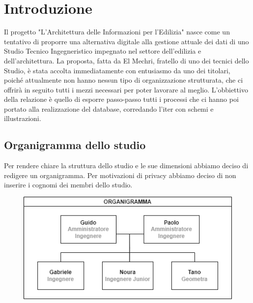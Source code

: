 \documentclass{elegantbook}
\begin{document}
        \newcommand\percImpresa{\the\numexpr\volumeImpresa/100\relax}
        \newcommand\volumeRappresentanza{\the\numexpr\percImpresa * 97 + \percImpresa * 3 *3 \relax}


        \newcommand\volumeNormalizzazione{\the\numexpr(\volumeCertificato/100)*40 + (\volumeCertificato/100)*10*2\relax}

        \newcommand\volumeImpegno{\the\numexpr\volumeAvvocato + (\volumeAvvocato/100)*10*2 \relax}

	\chapter{Introduzione}
	
	Il progetto "L'Architettura delle Informazioni per l'Edilizia" nasce come un tentativo di proporre una alternativa digitale 
        alla gestione attuale dei dati di uno Studio Tecnico Ingegneristico impegnato nel settore dell'edilizia e dell'architettura.
        La proposta, fatta da El Mechri, fratello di uno dei tecnici dello Studio, è stata accolta immediatamente con entusiasmo da uno dei titolari,
        poiché attualmente non hanno nessun tipo di organizzazione strutturata, che ci offrirà in seguito tutti i mezzi necessari per poter lavorare al meglio.
        L'obbiettivo della relazione è quello di esporre passo-passo tutti i processi che ci hanno poi portato alla realizzazione del database,
        corredando l'iter con schemi e illustrazioni.
	\section{Organigramma dello studio}
	
	Per rendere chiare la struttura dello studio e le sue dimensioni abbiamo deciso di redigere un organigramma.
        Per motivazioni di privacy abbiamo deciso di non inserire i cognomi dei membri dello studio. \\
        \begin{figure}[H]
		\includegraphics[scale=0.6]{../Img/Diagrams/Organigramma}
	\end{figure}	
\end{document}
